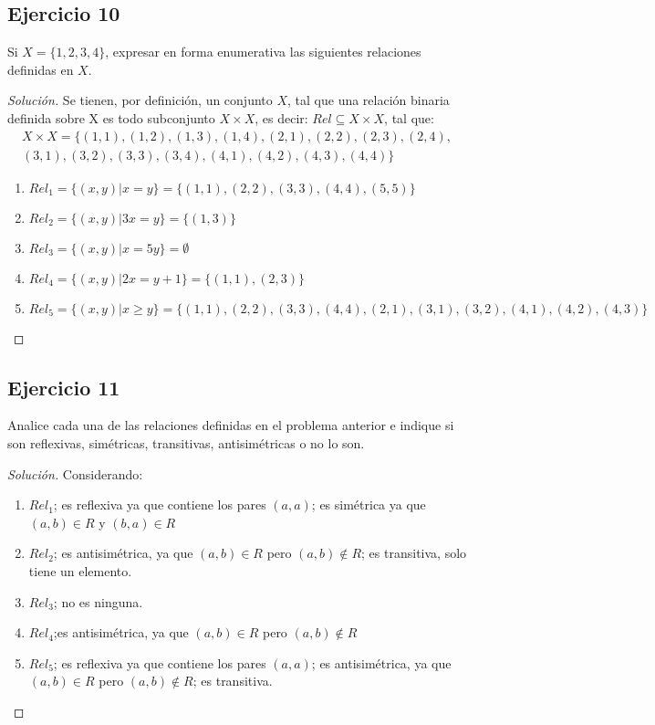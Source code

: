 \documentclass[a4paper,12pt]{article}
\newenvironment{solution}
  {\renewcommand\qedsymbol{$\blacksquare$}\begin{proof}[Solución]}
  {\end{proof}}
\begin{document}
\subsection{Ejercicio 10}
Si $X=\{1,2,3,4\}$, expresar en forma enumerativa las siguientes relaciones definidas en $X$.
\begin{solution}
Se tienen, por definición, un conjunto $X$, tal que una relación binaria definida sobre X es todo subconjunto $X\times X$, es decir: $Rel \subseteq X\times X$, tal que:
\begin{align}
    X\times X =\{(1,1),(1,2),(1,3),(1,4),(2,1),(2,2),(2,3),(2,4),\\(3,1),(3,2),(3,3),(3,4),(4,1),(4,2),(4,3),(4,4)\}
\end{align}
\begin{enumerate}
    \item $Rel_1 =\{(x,y)|x=y\}=\{(1,1),(2,2),(3,3),(4,4),(5,5)\}$
    \item $Rel_2 =\{(x,y)|3x=y\}=\{(1,3)\}$
    \item $Rel_3 =\{(x,y)|x=5y\}=\emptyset$
    \item $Rel_4 =\{(x,y)|2x=y+1\}=\{(1,1),(2,3)\}$
    \item $Rel_5 =\{(x,y)|x\geq y\}=\{(1,1),(2,2),(3,3),(4,4),(2,1),(3,1),(3,2),(4,1),(4,2),(4,3)\}$
\end{enumerate}
\end{solution}
\subsection{Ejercicio 11}
Analice cada una de las relaciones definidas en el problema anterior e indique si son reflexivas, simétricas, transitivas, antisimétricas o no lo son.
\begin{solution}
Considerando: 
\begin{enumerate}
    \item $Rel_1$; es reflexiva ya que contiene los pares $(a,a)$; es simétrica ya que $(a,b)\in R$ y $(b,a)\in R$
    \item $Rel_2$; es antisimétrica, ya que $(a,b)\in R$ pero $(a,b)\not\in R$; es transitiva, solo tiene un elemento.
    \item $Rel_3$; no es ninguna.
    \item $Rel_4$;es antisimétrica, ya que $(a,b)\in R$ pero $(a,b)\not\in R$
    \item $Rel_5$; es reflexiva ya que contiene los pares $(a,a)$; es antisimétrica, ya que $(a,b)\in R$ pero $(a,b)\not\in R$; es transitiva.
\end{enumerate}
\end{solution}
\end{document}
